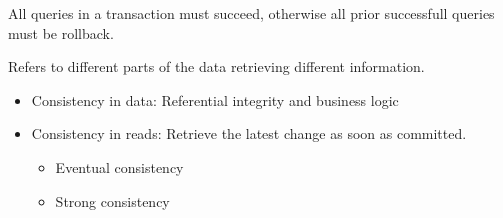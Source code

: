 \documentclass[../../main.tex]{subfiles}
\begin{document}
\begin{definition}[Atomicity]
    All queries in a transaction must succeed, otherwise all prior successfull queries must be rollback.
\end{definition}

\begin{definition}[Consistency]
    Refers to different parts of the data retrieving different information.
    \begin{itemize}
        \item Consistency in data: Referential integrity and business logic
        \item Consistency in reads: Retrieve the latest change as soon as committed.
        \begin{itemize}
            \item Eventual consistency
            \item Strong consistency
        \end{itemize}
    \end{itemize}
\end{definition}
\end{document}
